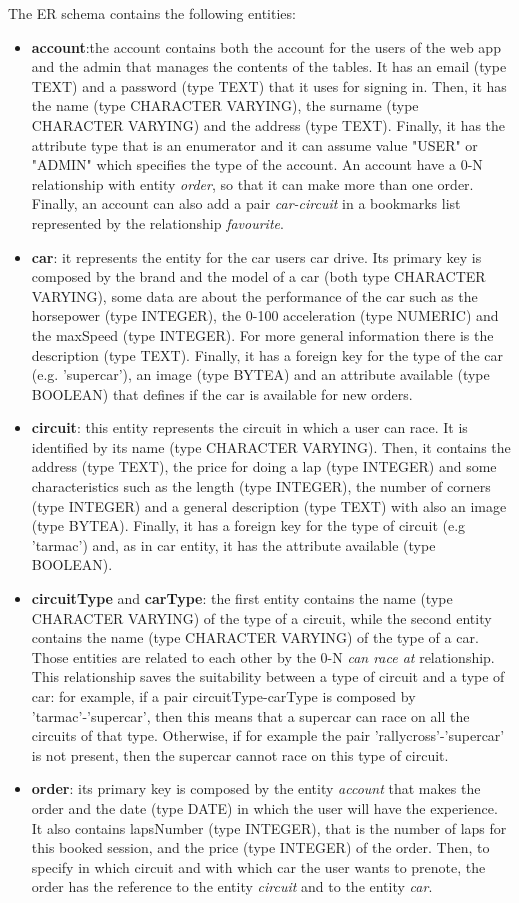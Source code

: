 The ER schema contains the following entities:
\begin{itemize}
	\item \textbf{account}:the account contains both the account for the users of the web app and the admin that manages the contents of the tables. It has an email (type TEXT) and a password (type TEXT) that it uses for signing in. Then, it has the name (type CHARACTER VARYING), the surname (type CHARACTER VARYING) and the address (type TEXT). Finally, it has the attribute type that is an enumerator and it can assume value "USER" or "ADMIN" which specifies the type of the account. An account have a 0-N relationship with entity \textit{order}, so that it can make more than one order. Finally, an account can also add a pair \textit{car-circuit} in a bookmarks list represented by the relationship \textit{favourite}.
	\item \textbf{car}: it represents the entity for the car users car drive. Its primary key is composed by the brand and the model of a car (both type CHARACTER VARYING), some data are about the performance of the car such as the horsepower (type INTEGER), the 0-100 acceleration (type NUMERIC) and the maxSpeed (type INTEGER). For more general information there is the description (type TEXT). Finally, it has a foreign key for the type of the car (e.g. 'supercar'), an image (type BYTEA) and an attribute available (type BOOLEAN) that defines if the car is available for new orders.
	\item \textbf{circuit}: this entity represents the circuit in which a user can race. It is identified by its name (type CHARACTER VARYING). Then, it contains the address (type TEXT), the price for doing a lap (type INTEGER) and some characteristics such as the length (type  INTEGER), the number of corners (type INTEGER) and a general description (type TEXT) with also an image (type BYTEA). Finally, it has a foreign key for the type of circuit (e.g 'tarmac') and, as in car entity, it has the attribute available (type BOOLEAN). 
	\item \textbf{circuitType} and \textbf{carType}: the first entity contains the name (type CHARACTER VARYING) of the type of a circuit, while the second entity contains the name (type CHARACTER VARYING) of the type of a car. Those entities are related to each other by the 0-N \textit{can race at} relationship. This relationship saves the suitability between a type of circuit and a type of car: for example, if a pair circuitType-carType is composed by 'tarmac'-'supercar', then this means that a supercar can race on all the circuits of that type. Otherwise, if for example the pair 'rallycross'-'supercar' is not present, then the supercar cannot race on this type of circuit.
	\item \textbf{order}: its primary key is composed by the entity \textit{account} that makes the order and the date (type DATE) in which the user will have the experience. It also contains lapsNumber (type INTEGER), that is the number of laps for this booked session, and the price (type INTEGER) of the order. Then, to specify in which circuit and with which car the user wants to prenote, the order has the reference to the entity \textit{circuit} and to the entity \textit{car}.
\end{itemize}
